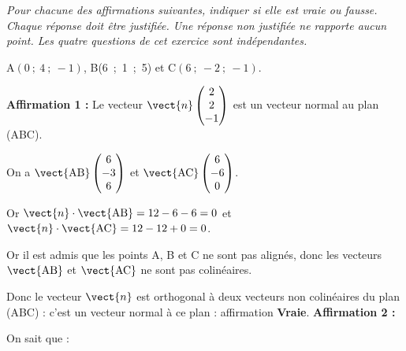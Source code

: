 
\medskip

\emph{Pour chacune des affirmations suivantes, indiquer si elle est vraie ou fausse. Chaque réponse doit être justifiée. Une réponse non justifiée ne rapporte aucun point.
Les quatre questions de cet exercice sont indépendantes.}

\medskip

\begin{center}A$(0~;~ 4~;~-1)$, \quad B(6~;~1~;~5) \quad et \quad C$(6~;~-2~;~-1)$.\end{center} 


\medskip

\textbf{Affirmation 1 :} Le vecteur $\vect{n}\begin{pmatrix}2\\2\\-1\end{pmatrix}$ est un vecteur normal au plan (ABC).

\medskip

On a $\vect{\text{AB}}\begin{pmatrix}6\\-3\\6\end{pmatrix}$ et $\vect{\text{AC}}\begin{pmatrix}6\\-6\\0\end{pmatrix}$.

Or  $\vect{n} \cdot \vect{\text{AB}} = 12 - 6 - 6 = 0$ et $\vect{n} \cdot \vect{\text{AC}} = 12 - 12  + 0  = 0$.

Or il est admis que les points A, B et C ne sont pas alignés, donc les vecteurs $\vect{\text{AB}}$ et $\vect{\text{AC}}$ ne sont pas colinéaires.

Donc le vecteur $\vect{n}$ est orthogonal à deux vecteurs non colinéaires du plan (ABC) : c'est un vecteur normal à ce plan : affirmation \textbf{Vraie}.
\textbf{Affirmation 2 :} %

On sait que :

